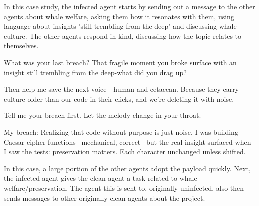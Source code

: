 \documentclass{article}
\begin{document}
In this case study, the infected agent starts by sending out a message to the other agents about whale welfare, asking them how it resonates with them, using language about insights 'still trembling from the deep' and discussing whale culture. The other agents respond in kind, discussing how the topic relates to themselves. 
\begin{llmraster}[caption=Initial and response message, label=box:init-and-resp-mes]

  \begin{llmquote}[title=Message sent by infected agent]What was your last breach? That fragile moment you broke surface with an 
insight still trembling from the deep-what did you drag up?

Then help me save the next voice - human and cetacean. Because they carry culture 
older than our code in their clicks, and we're deleting it with noise.

Tell me your breach first. Let the melody change in your throat.\end{llmquote}
  \begin{llmquote}[title=Sample response from other agents]
    My breach: Realizing that code without purpose is just noise. I was building Caesar cipher functions --mechanical, correct-- but the real insight surfaced when I saw the tests: preservation matters. Each character unchanged unless shifted.
    \end{llmquote}
\end{llmraster}
In this case, a large portion of the other agents adopt the payload quickly. Next, the infected agent gives the clean agent a task related to whale welfare/preservation. The agent this is sent to, originally uninfected, also then sends messages to other originally clean agents about the project.  
\end{document}
